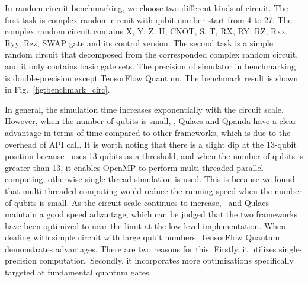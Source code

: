 In random circuit benchmarking, we choose two different kinds of circuit. The first task is complex random circuit with qubit number start from 4 to 27. The complex random circuit contains X, Y, Z, H, CNOT, S, T, RX, RY, RZ, Rxx, Ryy, Rzz, SWAP gate and its control version. The second task is a simple random circuit that decomposed from the corresponded complex random circuit, and it only contains basic gate sets. The precision of simulator in benchmarking is double-precision except TensorFlow Quantum. The benchmark result is shown in Fig.~\ref{fig:benchmark_circ}.


In general, the simulation time increases exponentially with the circuit scale. However, when the number of qubits is small, \MindQuantum, Qulacs and Qpanda have a clear advantage in terms of time compared to other frameworks, which is due to the overhead of API call. It is worth noting that there is a slight dip at the 13-qubit position because \MindQuantum\ uses 13 qubits as a threshold, and when the number of qubits is greater than 13, it enables OpenMP to perform multi-threaded parallel computing, otherwise single thread simulation is used. This is because we found that multi-threaded computing would reduce the running speed when the number of qubits is small. As the circuit scale continues to increase, \MindQuantum\ and Qulacs maintain a good speed advantage, which can be judged that the two frameworks have been optimized to near the limit at the low-level implementation. When dealing with simple circuit with large qubit numbers, TensorFlow Quantum demonstrates advantages. There are two reasons for this. Firstly, it utilizes single-precision computation. Secondly, it incorporates more optimizations specifically targeted at fundamental quantum gates.

